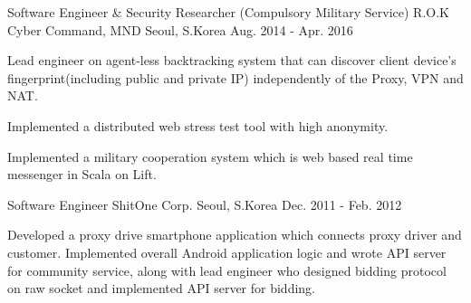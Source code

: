 \begin{cventries}
	\cventry
	{Software Engineer \& Security Researcher (Compulsory Military Service)} %
	{R.O.K Cyber Command, MND} %
	{Seoul, S.Korea} %
	{Aug. 2014 - Apr. 2016} %
	{
		\begin{cvitems} %
			\item {Lead engineer on agent-less backtracking system that can discover client device's fingerprint(including public and private IP) independently of the Proxy, VPN and NAT.}
			\item {Implemented a distributed web stress test tool with high anonymity.}
			\item {Implemented a military cooperation system which is web based real time messenger in Scala on Lift.}
		\end{cvitems}
	}

	\cventry
	{Software Engineer} %
	{ShitOne Corp.} %
	{Seoul, S.Korea} %
	{Dec. 2011 - Feb. 2012} %
	{
		\begin{cvitems} %
			\item {Developed a proxy drive smartphone application which connects proxy driver and customer. Implemented overall Android application logic and wrote API server for community service, along with lead engineer who designed bidding protocol on raw socket and implemented API server for bidding.}
		\end{cvitems}
	}

\end{cventries}
